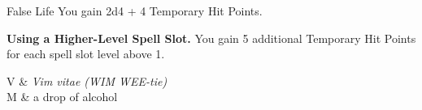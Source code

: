 \begin{Spell}[
  level={1st},
  time={1 action},
  range={Self},
  components={V, S, M},
  duration={Instantaneous},
  school={Necromancy},
  attack={None},
  effect={Buff}
]{False Life}
You gain 2d4 + 4 Temporary Hit Points.

\textbf{Using a Higher-Level Spell Slot.} You gain 5 additional Temporary Hit Points for each spell slot level above 1.

\begin{components}
V & \textit{Vim vitae (WIM WEE-tie)} \\
M & a drop of alcohol
\end{components}
\end{Spell}



